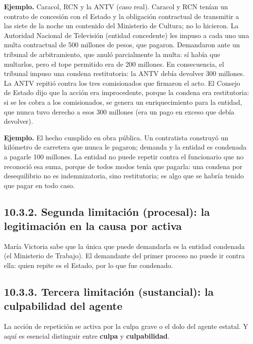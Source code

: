 \begin{ejemplo}
\textcolor[HTML]{4F6228}{\textbf{Ejemplo. }}Caracol, RCN y la ANTV (caso real). Caracol y RCN tenían un contrato de concesión con el Estado y la obligación contractual de transmitir a las siete de la noche un contenido del Ministerio de Cultura; no lo hicieron. La Autoridad Nacional de Televisión (entidad concedente) les impuso a cada uno una multa contractual de 500 millones de pesos, que pagaron. Demandaron ante un tribunal de arbitramiento, que anuló parcialmente la multa: sí había que multarlos, pero el tope permitido era de 200 millones. En consecuencia, el tribunal impuso una condena restitutoria: la ANTV debía devolver 300 millones. La ANTV repitió contra los tres comisionados que firmaron el acto. El Consejo de Estado dijo que la acción era improcedente, porque la condena era restitutoria: si se les cobra a los comisionados, se genera un enriquecimiento para la entidad, que nunca tuvo derecho a esos 300 millones (era un pago en exceso que debía devolver).
\par
\textcolor[HTML]{4F6228}{\textbf{Ejemplo. }}El hecho cumplido en obra pública. Un contratista construyó un kilómetro de carretera que nunca le pagaron; demanda y la entidad es condenada a pagarle 100 millones. La entidad no puede repetir contra el funcionario que no reconoció esa suma, porque de todos modos tenía que pagarla: una condena por desequilibrio no es indemnizatoria, sino restitutoria; es algo que se habría tenido que pagar en todo caso.
\end{ejemplo}
\subsection{10.3.2. Segunda limitación (procesal): la legitimación en la causa por activa}
María Victoria sabe que la única que puede demandarla es la entidad condenada (el Ministerio de Trabajo). El demandante del primer proceso no puede ir contra ella: quien repite es el Estado, por lo que fue condenado.

\subsection{10.3.3. Tercera limitación (sustancial): la culpabilidad del agente}
La acción de repetición se activa por la culpa grave o el dolo del agente estatal. Y aquí es esencial distinguir entre \textbf{culpa} y \textbf{culpabilidad}.

